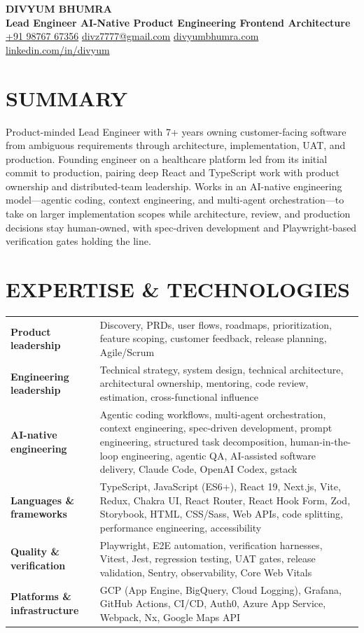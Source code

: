 \documentclass[10pt,a4paper]{article}
\newcommand{\lbl}[1]{\textbf{\textcolor{ink}{#1}}}
\newcommand{\rowgap}{\noalign{\vskip 4.5pt}}
\begin{document}
{\fontsize{25}{28}\selectfont\bfseries\color{ink} DIVYUM BHUMRA}\\[2pt]
{\large\bfseries\color{accent} Lead Engineer \textbar{} AI-Native Product Engineering \textbar{} Frontend Architecture}\\[4pt]
\href{tel:+919876767356}{+91 98767 67356} \enspace\textbullet\enspace
\href{mailto:divz7777@gmail.com}{divz7777@gmail.com} \enspace\textbullet\enspace
\href{https://www.divyumbhumra.com/}{divyumbhumra.com} \enspace\textbullet\enspace
\href{https://www.linkedin.com/in/divyum/}{linkedin.com/in/divyum}

\section{SUMMARY}
Product-minded Lead Engineer with 7+ years owning customer-facing software from ambiguous requirements through architecture, implementation, UAT, and production. Founding engineer on a healthcare platform led from its initial commit to production, pairing deep React and TypeScript work with product ownership and distributed-team leadership. Works in an AI-native engineering model---agentic coding, context engineering, and multi-agent orchestration---to take on larger implementation scopes while architecture, review, and production decisions stay human-owned, with spec-driven development and Playwright-based verification gates holding the line.

\section{EXPERTISE \& TECHNOLOGIES}
\begin{tabularx}{\textwidth}{@{}>{\raggedright\arraybackslash}p{}X@{}}
\lbl{Product leadership} & Discovery, PRDs, user flows, roadmaps, prioritization, feature scoping, customer feedback, release planning, Agile/Scrum \\ \rowgap
\lbl{Engineering leadership} & Technical strategy, system design, technical architecture, architectural ownership, mentoring, code review, estimation, cross-functional influence \\ \rowgap
\lbl{AI-native engineering} & Agentic coding workflows, multi-agent orchestration, context engineering, spec-driven development, prompt engineering, structured task decomposition, human-in-the-loop engineering, agentic QA, AI-assisted software delivery, Claude Code, OpenAI Codex, gstack \\ \rowgap
\lbl{Languages \& frameworks} & TypeScript, JavaScript (ES6+), React 19, Next.js, Vite, Redux, Chakra UI, React Router, React Hook Form, Zod, Storybook, HTML, CSS/Sass, Web APIs, code splitting, performance engineering, accessibility \\ \rowgap
\lbl{Quality \& verification} & Playwright, E2E automation, verification harnesses, Vitest, Jest, regression testing, UAT gates, release validation, Sentry, observability, Core Web Vitals \\ \rowgap
\lbl{Platforms \& infrastructure} & GCP (App Engine, BigQuery, Cloud Logging), Grafana, GitHub Actions, CI/CD, Auth0, Azure App Service, Webpack, Nx, Google Maps API
\end{tabularx}
\end{document}
